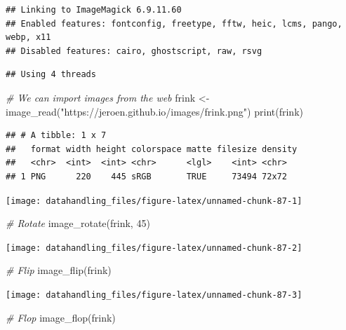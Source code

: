 \documentclass[
  12pt,
]{style/krantz}
\newenvironment{Shaded}{\begin{snugshade}}{\end{snugshade}}
\newcommand{\CommentTok}[1]{\textcolor[rgb]{0.56,0.35,0.01}{\textit{#1}}}
\newcommand{\DecValTok}[1]{\textcolor[rgb]{0.00,0.00,0.81}{#1}}
\newcommand{\FunctionTok}[1]{\textcolor[rgb]{0.00,0.00,0.00}{#1}}
\newcommand{\NormalTok}[1]{#1}
\newcommand{\OtherTok}[1]{\textcolor[rgb]{0.56,0.35,0.01}{#1}}
\newcommand{\StringTok}[1]{\textcolor[rgb]{0.31,0.60,0.02}{#1}}
\begin{document}
\begin{verbatim}
## Linking to ImageMagick 6.9.11.60
## Enabled features: fontconfig, freetype, fftw, heic, lcms, pango, webp, x11
## Disabled features: cairo, ghostscript, raw, rsvg
\end{verbatim}

\begin{verbatim}
## Using 4 threads
\end{verbatim}

\begin{Shaded}
\begin{Highlighting}[]
\CommentTok{\# We can import images from the web}
\NormalTok{frink }\OtherTok{\textless{}{-}} \FunctionTok{image\_read}\NormalTok{(}\StringTok{"https://jeroen.github.io/images/frink.png"}\NormalTok{)}
\FunctionTok{print}\NormalTok{(frink)}
\end{Highlighting}
\end{Shaded}

\begin{verbatim}
## # A tibble: 1 x 7
##   format width height colorspace matte filesize density
##   <chr>  <int>  <int> <chr>      <lgl>    <int> <chr>  
## 1 PNG      220    445 sRGB       TRUE     73494 72x72
\end{verbatim}

\texttt{[image: datahandling\_files/figure-latex/unnamed-chunk-87-1]}

\begin{Shaded}
\begin{Highlighting}[]
\CommentTok{\# Rotate}
\FunctionTok{image\_rotate}\NormalTok{(frink, }\DecValTok{45}\NormalTok{)}
\end{Highlighting}
\end{Shaded}

\texttt{[image: datahandling\_files/figure-latex/unnamed-chunk-87-2]}

\begin{Shaded}
\begin{Highlighting}[]
\CommentTok{\# Flip}
\FunctionTok{image\_flip}\NormalTok{(frink)}
\end{Highlighting}
\end{Shaded}

\texttt{[image: datahandling\_files/figure-latex/unnamed-chunk-87-3]}

\begin{Shaded}
\begin{Highlighting}[]
\CommentTok{\# Flop}
\FunctionTok{image\_flop}\NormalTok{(frink)}
\end{Highlighting}
\end{Shaded}
\end{document}

